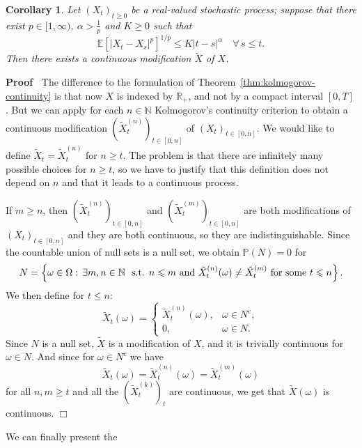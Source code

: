 \documentclass{article}
\newenvironment{proof}{\noindent\textbf{Proof\ }}{\hspace*{\fill}$\Box$\medskip}
\newtheorem{corollary}{Corollary}
\newcommand{\1}{\mathbbm{1}}
\begin{document}
\begin{corollary}
  \label{cor:kolmogorov.infinite.time}Let $(X_t)_{t \geqslant 0}$ be a
  real-valued stochastic process; suppose that there exist $p \in [1,
  \infty)$, $\alpha > \frac{1}{p}$ and $K \geqslant 0$ such that
  \[ \mathbb{E} [|X_t - X_s |^p]^{1 / p} \leqslant K |t - s|^{\alpha}  \quad
     \forall \, s \leqslant t. \]
  Then there exists a continuous modification $\tilde{X}$ of $X$.
\end{corollary}

\begin{proof}
  The difference to the formulation of Theorem~\ref{thm:kolmogorov-continuity}
  is that now $X$ is indexed by $\mathbb{R}_+$, and not by a compact interval
  $[0, T]$. But we can apply for each $n \in \mathbb{N}$ Kolmogorov's
  continuity criterion to obtain a continuous modification
  $(\tilde{X}^{(n)}_t)_{t \in [0, n]}$ of $(X_t)_{t \in [0, n]}$. We would
  like to define $\tilde{X}_t = \tilde{X}^{(n)}_t$ for $n \geqslant t$. The
  problem is that there are infinitely many possible choices for $n \geqslant
  t$, so we have to justify that this definition does not depend on $n$ and
  that it leads to a continuous process.

  If $m \geqslant n$, then $(\tilde{X}^{(n)}_t)_{t \in [0, n]}$ and
  $(\tilde{X}^{(m)}_t)_{t \in [0, n]}$ are both modifications of $(X_t)_{t \in
  [0, n]}$ and they are both continuous, so they are indistinguishable. Since
  the countable union of null sets is a null set, we obtain $\mathbb{P} (N) =
  0$ for
  \[ N = \left\{ \omega \in \Omega : \, \exists m, n \in \mathbb{N} \text{ \
     s.t. } n \leqslant m \text{ and } \tilde{X}^{(n)}_t (\omega) \neq
     \tilde{X}^{(m)}_t \text{ for some } t \leqslant n \right\} . \]
  We then define for $t \leqslant n$:
  \[ \tilde{X}_t (\omega) = \left\{\begin{array}{ll}
       \tilde{X}^{(n)}_t (\omega), & \omega \in N^c,\\
       0, & \omega \in N.
     \end{array}\right. \]
  Since $N$ is a null set, $\tilde{X}$ is a modification of $X$, and it is
  trivially continuous for $\omega \in N$. And since for $\omega \in N^c$ we
  have
  \[ \tilde{X}_t (\omega) = \tilde{X}_t^{(n)} (\omega) = \tilde{X}_t^{(m)}
     (\omega) \]
  for all $n, m \geqslant t$ and all the $(\tilde{X}^{(k)}_t)_t$ are
  continuous, we get that $\tilde{X} (\omega)$ is continuous.
\end{proof}

We can finally present the
\end{document}
